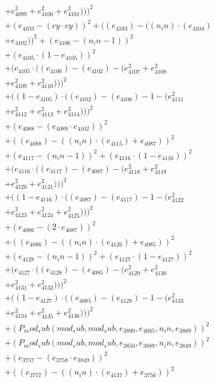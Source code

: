 \documentclass[10pt, a4paper]{article}
\begin{document}
\begin{align*}
& + e_{4099}^{2} + e_{4100}^{2} + e_{4101}^{2})))^{2} \\
& + (e_{4103} - (cy  \cdot  cy))^{2} + ((e_{4103}) - ((n_in)  \cdot  (e_{4104}) \\
& + e_{4102}))^{2} + (e_{4106} - (n_in - 1))^{2} \\
& + (e_{4105}  \cdot  (1 - e_{4105}))^{2} \\
& + (e_{4105}  \cdot  ((e_{4106}) - (e_{4102}) - (e_{4107}^{2} + e_{4108}^{2} \\
& + e_{4109}^{2} + e_{4110}^{2})))^{2} \\
& + ((1 - e_{4105})  \cdot  ((e_{4102}) - (e_{4106}) - 1 - (e_{4111}^{2} \\
& + e_{4112}^{2} + e_{4113}^{2} + e_{4114}^{2})))^{2} \\
& + (e_{4088} - (e_{4089}  \cdot  e_{4102}))^{2} \\
& + ((e_{4088}) - ((n_in)  \cdot  (e_{4115}) + e_{4087}))^{2} \\
& + (e_{4117} - (n_in - 1))^{2} + (e_{4116}  \cdot  (1 - e_{4116}))^{2} \\
& + (e_{4116}  \cdot  ((e_{4117}) - (e_{4087}) - (e_{4118}^{2} + e_{4119}^{2} \\
& + e_{4120}^{2} + e_{4121}^{2})))^{2} \\
& + ((1 - e_{4116})  \cdot  ((e_{4087}) - (e_{4117}) - 1 - (e_{4122}^{2} \\
& + e_{4123}^{2} + e_{4124}^{2} + e_{4125}^{2})))^{2} \\
& + (e_{4086} - (2  \cdot  e_{4087}))^{2} \\
& + ((e_{4086}) - ((n_in)  \cdot  (e_{4126}) + e_{4085}))^{2} \\
& + (e_{4128} - (n_in - 1))^{2} + (e_{4127}  \cdot  (1 - e_{4127}))^{2} \\
& + (e_{4127}  \cdot  ((e_{4128}) - (e_{4085}) - (e_{4129}^{2} + e_{4130}^{2} \\
& + e_{4131}^{2} + e_{4132}^{2})))^{2} \\
& + ((1 - e_{4127})  \cdot  ((e_{4085}) - (e_{4128}) - 1 - (e_{4133}^{2} \\
& + e_{4134}^{2} + e_{4135}^{2} + e_{4136}^{2})))^{2} \\
& + (P_mod_sub(mod_sub, mod_sub, e_{3890}, e_{4085}, n_in, e_{3889}))^{2} \\
& + (P_mod_sub(mod_sub, mod_sub, e_{3850}, e_{3889}, n_in, e_{3849}))^{2} \\
& + (e_{3757} - (e_{3758}  \cdot  e_{3849}))^{2} \\
& + ((e_{3757}) - ((n_in)  \cdot  (e_{4137}) + e_{3756}))^{2} \\

\end{align*}
\end{document}
